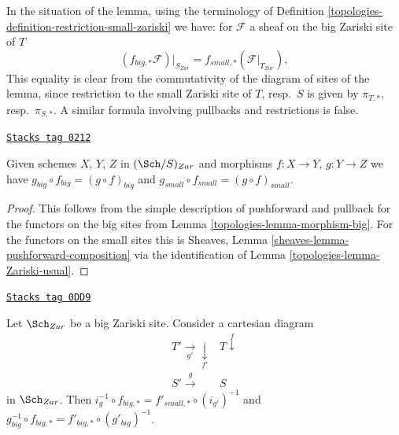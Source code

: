 In the situation of the lemma, using the terminology of
Definition \ref{topologies-definition-restriction-small-zariski}
we have: for $\mathcal{F}$ a sheaf on the big Zariski site of $T$
$$
(f_{big, *}\mathcal{F})|_{S_{Zar}} =
f_{small, *}(\mathcal{F}|_{T_{Zar}}),
$$
This equality is clear from the commutativity of the diagram of
sites of the lemma, since restriction to the small Zariski site of
$T$, resp.\ $S$ is given by $\pi_{T, *}$, resp.\ $\pi_{S, *}$. A similar
formula involving pullbacks and restrictions is false.

\begin{lemma}[Composition]
\label{topologies-lemma-composition}
\href{https://stacks.math.columbia.edu/tag/0212}{\texttt{Stacks tag 0212}}

Given schemes $X$, $Y$, $Z$ in $(\Sch/S)_{Zar}$
and morphisms $f : X \to Y$, $g : Y \to Z$ we have
$g_{big} \circ f_{big} = (g \circ f)_{big}$ and
$g_{small} \circ f_{small} = (g \circ f)_{small}$.
\end{lemma}

\begin{proof}

This follows from the simple description of pushforward
and pullback for the functors on the big sites from
Lemma \ref{topologies-lemma-morphism-big}. For the functors
on the small sites this is
Sheaves, Lemma \ref{sheaves-lemma-pushforward-composition}
via the identification of Lemma \ref{topologies-lemma-Zariski-usual}.
\end{proof}

\begin{lemma}
\label{topologies-lemma-morphism-big-small-cartesian-diagram}
\href{https://stacks.math.columbia.edu/tag/0DD9}{\texttt{Stacks tag 0DD9}}

Let $\Sch_{Zar}$ be a big Zariski site. Consider a cartesian diagram
$$
\begin{array}{cc}T' \underset{g'}{\longrightarrow}\underset{f'}{\downarrow} & T \overset{f}{\downarrow} \\ S' \overset{g}{\longrightarrow} & S\end{array}
$$
in $\Sch_{Zar}$. Then
$i_g^{-1} \circ f_{big, *} = f'_{small, *} \circ (i_{g'})^{-1}$
and $g_{big}^{-1} \circ f_{big, *} = f'_{big, *} \circ (g'_{big})^{-1}$.
\end{lemma}

